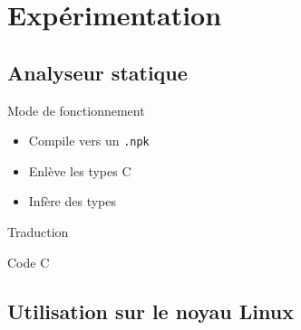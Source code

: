 \section{Expérimentation}

\subsection{Analyseur statique}

\begin{frame}{Mode de fonctionnement}

  \begin{itemize}
  \item Compile vers un \texttt{.npk}
  \item Enlève les types C
  \item Infère des types \langname
  \end{itemize}
\end{frame}


\begin{frame}{Traduction}
\begin{exampleblock}{Code C}
\end{exampleblock}



\end{frame}

\subsection{Utilisation sur le noyau Linux}


